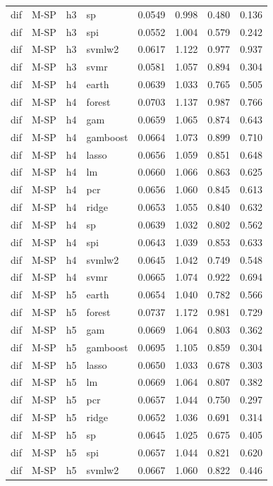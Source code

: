 \begin{ThreePartTable}
\begin{longtable}[t]{llclcccc}
dif & M-SP & h3 & sp & 0.0549 & 0.998 & 0.480 & 0.136\\
dif & M-SP & h3 & spi & 0.0552 & 1.004 & 0.579 & 0.242\\
dif & M-SP & h3 & svmlw2 & 0.0617 & 1.122 & 0.977 & 0.937\\
dif & M-SP & h3 & svmr & 0.0581 & 1.057 & 0.894 & 0.304\\
\addlinespace
dif & M-SP & h4 & earth & 0.0639 & 1.033 & 0.765 & 0.505\\
dif & M-SP & h4 & forest & 0.0703 & 1.137 & 0.987 & 0.766\\
dif & M-SP & h4 & gam & 0.0659 & 1.065 & 0.874 & 0.643\\
dif & M-SP & h4 & gamboost & 0.0664 & 1.073 & 0.899 & 0.710\\
dif & M-SP & h4 & lasso & 0.0656 & 1.059 & 0.851 & 0.648\\
dif & M-SP & h4 & lm & 0.0660 & 1.066 & 0.863 & 0.625\\
dif & M-SP & h4 & pcr & 0.0656 & 1.060 & 0.845 & 0.613\\
dif & M-SP & h4 & ridge & 0.0653 & 1.055 & 0.840 & 0.632\\
dif & M-SP & h4 & sp & 0.0639 & 1.032 & 0.802 & 0.562\\
dif & M-SP & h4 & spi & 0.0643 & 1.039 & 0.853 & 0.633\\
dif & M-SP & h4 & svmlw2 & 0.0645 & 1.042 & 0.749 & 0.548\\
dif & M-SP & h4 & svmr & 0.0665 & 1.074 & 0.922 & 0.694\\
\addlinespace
dif & M-SP & h5 & earth & 0.0654 & 1.040 & 0.782 & 0.566\\
dif & M-SP & h5 & forest & 0.0737 & 1.172 & 0.981 & 0.729\\
dif & M-SP & h5 & gam & 0.0669 & 1.064 & 0.803 & 0.362\\
dif & M-SP & h5 & gamboost & 0.0695 & 1.105 & 0.859 & 0.304\\
dif & M-SP & h5 & lasso & 0.0650 & 1.033 & 0.678 & 0.303\\
dif & M-SP & h5 & lm & 0.0669 & 1.064 & 0.807 & 0.382\\
dif & M-SP & h5 & pcr & 0.0657 & 1.044 & 0.750 & 0.297\\
dif & M-SP & h5 & ridge & 0.0652 & 1.036 & 0.691 & 0.314\\
dif & M-SP & h5 & sp & 0.0645 & 1.025 & 0.675 & 0.405\\
dif & M-SP & h5 & spi & 0.0657 & 1.044 & 0.821 & 0.620\\
dif & M-SP & h5 & svmlw2 & 0.0667 & 1.060 & 0.822 & 0.446\\

\end{longtable}
\end{ThreePartTable}
